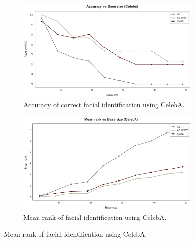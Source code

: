 \documentclass{IEEEcsmag}
\begin{document}
\begin{figure}[ht]
    \centering
    \begin{subfigure}{0.4\textwidth}
        \centering
        \includegraphics[width=\linewidth]{results/accuracy_vs_base_size_celeba.png}
        \caption{Accuracy of correct facial identification using CelebA.}
        \label{fig:accuracy_celeba}
    \end{subfigure}
    \hfill
    \begin{subfigure}{0.4\textwidth}
        \centering
        \includegraphics[width=\linewidth]{results/mean_vs_base_size_celeba.png}
        \caption{Mean rank of facial identification using CelebA.}
        \label{fig:mean_celeba}
    \end{subfigure}


\end{figure}
\end{document}
